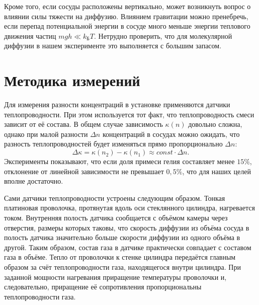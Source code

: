 \documentclass[a4paper,11.5pt]{article} %
\begin{document}
Кроме того, если сосуды расположены вертикально, может возникнуть вопрос о влиянии силы тяжести на диффузию. Влиянием гравитации можно пренебречь, если перепад потенциальной энергии в сосуде много меньше энергии теплового движения частиц $mgh \ll k_{\text{Б}} T$. Нетрудно проверить, что для молекулярной диффузии в нашем эксперименте это выполняется с большим запасом.

\section{Методика измерений}

 Для измерения разности концентраций в установке применяются датчики теплопроводности. При этом используется тот факт, что теплопроводность смеси зависит от её состава. В общем случае зависимость $\kappa(n)$ довольно сложна, однако при малой разности $\Delta n$ концентраций в сосудах можно ожидать, что разность теплопроводностей будет изменяться прямо пропорционально $\Delta n$: $$\Delta \kappa = \kappa (n_2) - \kappa (n_1) \approx const \cdot \Delta n.$$
Эксперименты показывают, что если доля примеси гелия составляет менее $15\%$, отклонение от линейной зависимости не превышает $0,5\%$, что для наших целей вполне достаточно.

Сами датчики теплопроводности устроены следующим образом. Тонкая платиновая проволочка, протянутая вдоль оси стеклянного цилиндра, нагревается током. Внутренняя полость датчика сообщается с объёмом камеры через отверстия, размеры которых таковы, что скорость диффузии из объёма сосуда в полость датчика значительно больше скорости диффузии из одного объёма в другой. Таким образом, состав газа в датчике практически совпадает с составом газа в объёме. Тепло от проволочки к стенке цилиндра передаётся главным образом за счёт теплопроводности газа, находящегося внутри цилиндра. При заданной мощности нагревания приращение температуры проволочки и, следовательно, приращение её сопротивления пропорциональны теплопроводности газа.
\end{document}
